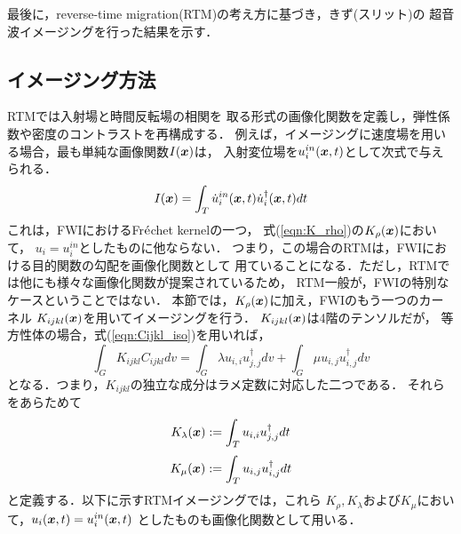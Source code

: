 ﻿最後に，reverse-time migration(RTM)の考え方に基づき，きず(スリット)の
超音波イメージングを行った結果を示す．
\subsection{イメージング方法}
RTMでは入射場と時間反転場の相関を
取る形式の画像化関数を定義し，弾性係数や密度のコントラストを再構成する．
例えば，イメージングに速度場を用いる場合，最も単純な画像関数$I(\boldsymbol{x})$は，
入射変位場を$u_i^{in}(\boldsymbol{x},t)$として次式で与えられる．
\begin{equation}
	I(\boldsymbol{x})=\int_T \dot u^{in}_i(\boldsymbol{x},t) \dot u_i^{\dagger}(\boldsymbol{x},t)dt
	\label{eqn:Ix}
\end{equation}
これは，FWIにおけるFr$\acute{\rm e}$chet kernelの一つ，
式(\ref{eqn:K_rho})の$K_\rho(\boldsymbol{x})$において，
$u_i=u_i^{in}$としたものに他ならない．
つまり，この場合のRTMは，FWIにおける目的関数の勾配を画像化関数として
用ていることになる．ただし，RTMでは他にも様々な画像化関数が提案されているため\cite{Jones}，
RTM一般が，FWIの特別なケースということではない．
本節では，$K_\rho(\boldsymbol{x})$に加え，FWIのもう一つのカーネル
$K_{ijkl}(\boldsymbol{x})$を用いてイメージングを行う．
$K_{ijkl}(\boldsymbol{x})$は4階のテンソルだが，
等方性体の場合，式(\ref{eqn:Cijkl_iso})を用いれば，
\begin{equation}
	\int_G K_{ijkl}C_{ijkl}dv
	=
	\int_G \lambda u_{i,i}u^{\dagger}_{j,j} dv
	+
	\int_G \mu u_{i,j}u^{\dagger}_{i,j} dv
	\label{eqn:}
\end{equation}
となる．つまり，$K_{ijkl}$の独立な成分はラメ定数に対応した二つである．
それらをあらためて
\begin{equation}
	K_\lambda(\boldsymbol{x}):= \int_T u_{i,i}u^{\dagger}_{j,j} dt
	\label{eqn:K_lmb}
\end{equation}
\begin{equation}
	K_\mu(\boldsymbol{x}):= \int_T u_{i,j}u^{\dagger}_{i,j} dt
	\label{eqn:K_mu}
\end{equation}
と定義する．以下に示すRTMイメージングでは，これら
$K_\rho, K_\lambda$および$K_\mu$において，$u_i(\boldsymbol{x},t)=u_i^{in}(\boldsymbol{x},t)$
としたものも画像化関数として用いる．
